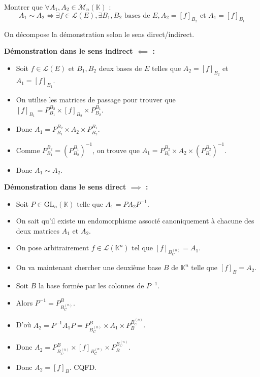 \documentclass[11pt, a4paper]{article}
\theoremstyle{definition}
\begin{document}
\clearpage



\clearpage

\begin{tcolorbox}[instructionstyle]

Montrer que $\forall A_1, A_2 \in \mathcal M_n(\mathbb K)$ :
\[
A_1 \sim A_2 \iff \exists f \in \mathcal L(E), \exists B_1,B_2 \text{ bases de } E, A_2 = [f]_{B_2} \text{ et } A_1 = [f]_{B_1}
\]
\end{tcolorbox}

On décompose la démonstration selon le sens direct/indirect.

\textbf{Démonstration dans le sens indirect $\impliedby$ :}

\begin{itemize}
\item Soit $f \in \mathcal L(E)$ et $B_1,B_2$ deux bases de $E$ telles que $A_2 = [f]_{B_2}$ et $A_1 = [f]_{B_1}$.
\item On utilise les matrices de passage pour trouver que $[f]_{B_1} = P_{B_1}^{B_2} \times [f]_{B_2} \times P_{B_2}^{B_1}$.
\item Donc $A_1 = P_{B_1}^{B_2} \times A_2 \times P_{B_2}^{B_1}$.
\item Comme $P_{B_1}^{B_2} = (P_{B_2}^{B_1})^{-1}$, on trouve que $A_1 = P_{B_1}^{B_2} \times A_2 \times (P_{B_1}^{B_2})^{-1}$.
\item Donc $A_1 \sim A_2$.
\end{itemize}

\textbf{Démonstration dans le sens direct $\implies$ :}

\begin{itemize}
\item Soit $P \in \mathrm{GL}_n(\mathbb{K})$ telle que $A_1 = P A_2 P^{-1}$.
\item On sait qu'il existe un endomorphisme associé canoniquement à chacune des deux matrices $A_1$ et $A_2$.
\item On pose arbitrairement $f \in \mathcal L(\mathbb{K}^n)$ tel que $[f]_{B_C^{(n)}} = A_1$.
\item On va maintenant chercher une deuxième base $B$ de $\mathbb{K}^n$ telle que $[f]_B = A_2$.
\item Soit $B$ la base formée par les colonnes de $P^{-1}$.
\item Alors $P^{-1} = P_{B_C^{(n)}}^B$.
\item D'où $A_2 = P^{-1} A_1 P = P_{B_C^{(n)}}^B \times A_1 \times P_{B}^{B_C^{(n)}}$.
\item Donc $A_2 = P_{B_C^{(n)}}^B \times [f]_{B_C^{(n)}} \times P_{B}^{B_C^{(n)}}$.
\item Donc $A_2 = [f]_B$. CQFD.
\end{itemize}
\end{document}

